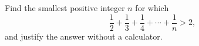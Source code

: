 Find the smallest positive integer $n$ for which
\[
\dfrac{1}{2}+\dfrac{1}{3}+\dfrac{1}{4}+\cdots+\dfrac{1}{n}>2 ,
\]
and justify the answer without a calculator.
